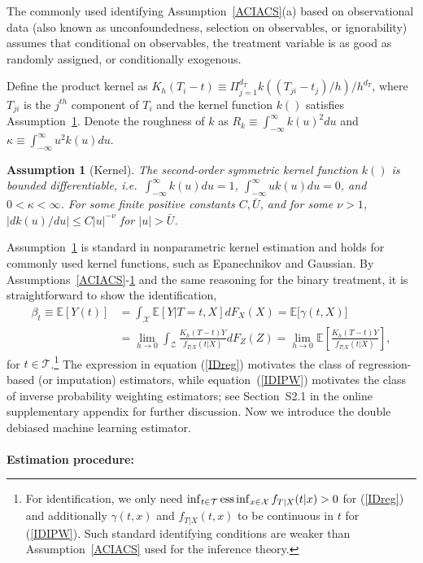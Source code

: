 \documentclass[lettersize, 12pt]{article}
\newtheorem{assumption}{Assumption}
\begin{document}
The commonly used identifying Assumption~\ref{ACIACS}(a) based on observational data (also known as unconfoundedness, selection on observables, or ignorability) assumes that conditional on observables, the treatment variable is as good as randomly assigned, or conditionally exogenous.

Define the product kernel as $K_h(T_i-t) \equiv \Pi_{j=1}^{d_T} k((T_{ji} - t_j)/h)/h^{d_T}$, where $T_{ji}$ is the $j^{th}$ component of $T_i$ and the kernel function $k()$ satisfies Assumption~\ref{Akernel}.
Denote the roughness of $k$ as $R_k \equiv \int_{-\infty}^\infty k(u)^2 du$ and $\kappa \equiv \int_{-\infty}^\infty  u^2 k(u) du$.

\begin{assumption}[Kernel]
The second-order symmetric kernel function $k()$ is bounded differentiable, i.e.\ $\int_{-\infty}^\infty  k(u)du =1$, $\int_{-\infty}^\infty  uk(u) du = 0$, and $0 < \kappa < \infty$.
For some finite positive constants $C, \bar{U}$, and for some $\nu > 1$,  $|dk(u)/du| \leq C |u|^{-\nu}$ for $|u| > \bar{{U}}$.
\label{Akernel}
\end{assumption}

Assumption~\ref{Akernel} is standard in nonparametric kernel estimation and holds for commonly used kernel functions, such as Epanechnikov and Gaussian.
By Assumptions~\ref{ACIACS}-\ref{Akernel} and the same reasoning for the binary treatment, it is straightforward to show the identification,
\begin{align}
\beta_t \equiv \mathbb{E}[Y(t)] & = \int_\mathcal{X} \mathbb{E}[Y|T=t, X] dF_{X}(X) 
= \mathbb{E}\big[\gamma(t, X)\big]
\label{IDreg} \\
&= 
\lim_{h\rightarrow 0}\int_\mathcal{Z}  \frac{K_h(T-t) Y}{f_{T|X}(t|X)} dF_{Z}(Z)
= \lim_{h\rightarrow 0} \mathbb{E}\left[\frac{K_h(T-t) Y}{f_{T|X}(t|X)}  \right], \label{IDIPW}
\end{align}
 for $t\in\mathcal{T}$.\footnote{For identification, we only need $\inf_{t\in\mathcal{T}} {\rm ess}\inf_{x\in\mathcal{X}} f_{T|X}(t|x) > 0$
 for (\ref{IDreg}) and additionally $\gamma(t,x)$ and $f_{T|X}(t,x)$ to be continuous in $t$ for (\ref{IDIPW}).
Such standard identifying conditions are weaker than Assumption~\ref{ACIACS} used for the inference theory.} The expression in equation (\ref{IDreg}) motivates the class of regression-based (or imputation) estimators, while equation~(\ref{IDIPW}) motivates the class of inverse probability weighting estimators; see Section~S2.1 in the online supplementary appendix for further discussion.
 Now we introduce the double debiased machine learning estimator.
\\
\\
\textbf{Estimation procedure:}
\end{document}
